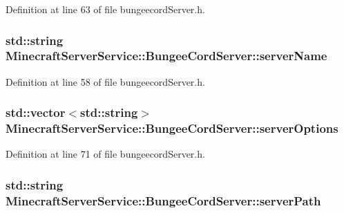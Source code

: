 Definition at line 63 of file bungeecord\+Server.\+h.

\subsubsection[{\texorpdfstring{server\+Name}{serverName}}]{\setlength{\rightskip}{0pt plus 5cm}std\+::string Minecraft\+Server\+Service\+::\+Bungee\+Cord\+Server\+::server\+Name}\hypertarget{class_minecraft_server_service_1_1_bungee_cord_server_affe74246ec8e01cadd21fb8ffe613934}{}\label{class_minecraft_server_service_1_1_bungee_cord_server_affe74246ec8e01cadd21fb8ffe613934}


Definition at line 58 of file bungeecord\+Server.\+h.

\subsubsection[{\texorpdfstring{server\+Options}{serverOptions}}]{\setlength{\rightskip}{0pt plus 5cm}std\+::vector$<$std\+::string$>$ Minecraft\+Server\+Service\+::\+Bungee\+Cord\+Server\+::server\+Options\hspace{0.3cm}{\ttfamily [protected]}}\hypertarget{class_minecraft_server_service_1_1_bungee_cord_server_a3fc820aa9d0a5620f10c59e585690aa5}{}\label{class_minecraft_server_service_1_1_bungee_cord_server_a3fc820aa9d0a5620f10c59e585690aa5}


Definition at line 71 of file bungeecord\+Server.\+h.

\subsubsection[{\texorpdfstring{server\+Path}{serverPath}}]{\setlength{\rightskip}{0pt plus 5cm}std\+::string Minecraft\+Server\+Service\+::\+Bungee\+Cord\+Server\+::server\+Path\hspace{0.3cm}{\ttfamily [protected]}}\hypertarget{class_minecraft_server_service_1_1_bungee_cord_server_a6d51d89bb1978039381a04af2f7b5880}{}\label{class_minecraft_server_service_1_1_bungee_cord_server_a6d51d89bb1978039381a04af2f7b5880}


